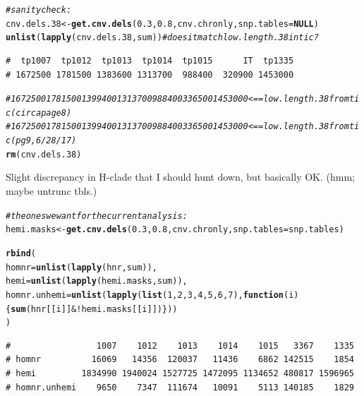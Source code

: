 \documentclass{article}\usepackage[]{graphicx}\usepackage[]{color}
\makeatletter
\newcommand{\hlnum}[1]{\textcolor[rgb]{0.686,0.059,0.569}{#1}}%
\newcommand{\hlcom}[1]{\textcolor[rgb]{0.678,0.584,0.686}{\textit{#1}}}%
\newcommand{\hlopt}[1]{\textcolor[rgb]{0,0,0}{#1}}%
\newcommand{\hlstd}[1]{\textcolor[rgb]{0.345,0.345,0.345}{#1}}%
\newcommand{\hlkwa}[1]{\textcolor[rgb]{0.161,0.373,0.58}{\textbf{#1}}}%
\newcommand{\hlkwb}[1]{\textcolor[rgb]{0.69,0.353,0.396}{#1}}%
\newcommand{\hlkwc}[1]{\textcolor[rgb]{0.333,0.667,0.333}{#1}}%
\newcommand{\hlkwd}[1]{\textcolor[rgb]{0.737,0.353,0.396}{\textbf{#1}}}%
\newenvironment{kframe}{%
 \def\at@end@of@kframe{}%
 \ifinner\ifhmode%
  \def\at@end@of@kframe{\end{minipage}}%
  \begin{minipage}{\columnwidth}%
 \fi\fi%
 \def\FrameCommand##1{\hskip\@totalleftmargin \hskip-\fboxsep
 \colorbox{shadecolor}{##1}\hskip-\fboxsep
     \hskip-\linewidth \hskip-\@totalleftmargin \hskip\columnwidth}%
 \MakeFramed {\advance\hsize-\width
   \@totalleftmargin\z@ \linewidth\hsize
   \@setminipage}}%
 {\par\unskip\endMakeFramed%
 \at@end@of@kframe}
\newenvironment{knitrout}{}{} %
\makeatother
\begin{document}
\begin{knitrout}
\begin{kframe}
\begin{alltt}
\hlcom{# sanity check:}
\hlstd{cnv.dels.38} \hlkwb{<-} \hlkwd{get.cnv.dels}\hlstd{(}\hlnum{0.3}\hlstd{,} \hlnum{0.8}\hlstd{, cnv.chronly,} \hlkwc{snp.tables} \hlstd{=} \hlkwa{NULL}\hlstd{)}
\hlkwd{unlist}\hlstd{(}\hlkwd{lapply}\hlstd{(cnv.dels.38,sum))} \hlcom{# does it match low.length.38 in tic ?}
\end{alltt}
\begin{verbatim}
#  tp1007  tp1012  tp1013  tp1014  tp1015      IT  tp1335 
# 1672500 1781500 1383600 1313700  988400  320900 1453000
\end{verbatim}
\begin{alltt}
\hlcom{# 1672500 1781500 1399400 1313700 988400 336500 1453000 <== low.length.38 from tic (circa page 8)}
\hlcom{# 1672500 1781500 1399400 1313700 988400 336500 1453000 <== low.length.38 from tic (pg9, 6/28/17)}
\hlkwd{rm}\hlstd{(cnv.dels.38)}
\end{alltt}
\end{kframe}
\end{knitrout}

Slight discrepancy in H-clade that I should hunt down, but basically OK. (hmm; maybe untrunc tbls.)

\begin{knitrout}\footnotesize
{}\color{fgcolor}\begin{kframe}
\begin{alltt}
\hlcom{# the ones we want for the current analysis:}
\hlstd{hemi.masks} \hlkwb{<-} \hlkwd{get.cnv.dels}\hlstd{(}\hlnum{0.3}\hlstd{,} \hlnum{0.8}\hlstd{, cnv.chronly,} \hlkwc{snp.tables}\hlstd{=snp.tables)}

\hlkwd{rbind}\hlstd{(}
  \hlkwc{homnr}        \hlstd{=} \hlkwd{unlist}\hlstd{(}\hlkwd{lapply}\hlstd{(hnr,sum)),}
  \hlkwc{hemi}         \hlstd{=} \hlkwd{unlist}\hlstd{(}\hlkwd{lapply}\hlstd{(hemi.masks, sum)),}
  \hlkwc{homnr.unhemi} \hlstd{=} \hlkwd{unlist}\hlstd{(}\hlkwd{lapply}\hlstd{(}\hlkwd{list}\hlstd{(}\hlnum{1}\hlstd{,}\hlnum{2}\hlstd{,}\hlnum{3}\hlstd{,}\hlnum{4}\hlstd{,}\hlnum{5}\hlstd{,}\hlnum{6}\hlstd{,}\hlnum{7}\hlstd{),} \hlkwa{function}\hlstd{(}\hlkwc{i}\hlstd{)\{}\hlkwd{sum}\hlstd{(hnr[[i]]} \hlopt{& !}\hlstd{hemi.masks[[i]])\}))}
\hlstd{)}
\end{alltt}
\begin{verbatim}
#                 1007    1012    1013    1014    1015   3367    1335
# homnr          16069   14356  120037   11436    6862 142515    1854
# hemi         1834990 1940024 1527725 1472095 1134652 480817 1596965
# homnr.unhemi    9650    7347  111674   10091    5113 140185    1829
\end{verbatim}
\end{kframe}
\end{knitrout}
\end{document}
